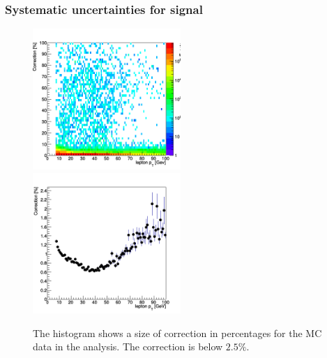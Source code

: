 \documentclass[aspectratio=1610, english]{beamer}
\begin{document}
\begin{frame}
\frametitle{Systematic uncertainties for signal}

\begin{figure} [H]
\centering
\includegraphics[width=0.5\textwidth]{syst1_signal.png}\hfill
\includegraphics[width=0.5\textwidth]{syst2_signal.png}
\caption{The histogram shows a size of correction in percentages for the MC data in the analysis. The correction is below $2.5\%$. }
\end{figure}

\end{frame}
\end{document}
